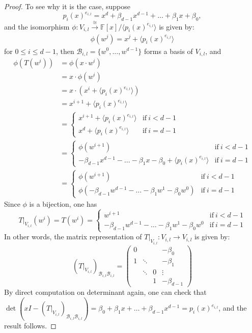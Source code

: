 \documentclass[12pt]{amsbook}
\begin{document}
\begin{proof}
\bigskip
To see why it is the case, suppose 
$$p_i(x)^{e_{i,l}} = x^d + \beta_{d-1}x^{d-1} + \dots + \beta_1 x + \beta_0,$$ 
and the isomorphism $\phi : V_{i,l} \xrightarrow{\cong} \mathbb{F}[x]/\langle p_i(x)^{e_{i,l}} \rangle$ is given by:
\begin{align*}
\phi(w^{j}) = x^j + \langle p_i(x)^{e_{i,l}} \rangle 
\end{align*}
for $0 \leq i \leq d-1$, then $\mathcal{B}_{i,l} = \{w^0, \dots, w^{d-1}\}$ forms a basis of $V_{i,l}$, and 
\begin{align*}
\phi(T(w^i)) &= \phi(x \cdot w^i)\\ 
&= x \cdot \phi(w^i)\\ &= x \cdot \left(x^{i} + \langle p_i(x)^{e_{i,l}} \rangle\right)\\ 
&= x^{i+1} + \langle p_i(x)^{e_{i,l}} \rangle \\
&= \begin{cases} x^{i+1} + \langle p_i(x)^{e_{i,l}} \rangle & \text{if}\ i < d-1 \\
x^d +  \langle p_i(x)^{e_{i,l}} \rangle & \text{if}\ i = d-1 \end{cases}\\
&= \begin{cases} \phi(w^{i+1}) & \text{if}\ i < d-1 \\
-\beta_{d-1}x^{d-1} - \dots - \beta_1 x - \beta_0 +  \langle p_i(x)^{e_{i,l}} \rangle & \text{if}\ i = d-1 \end{cases} \\
&= \begin{cases} \phi(w^{i+1}) & \text{if}\ i < d-1 \\
\phi(-\beta_{d-1}w^{d-1} - \dots - \beta_1 w^{1} - \beta_0 w^0) & \text{if}\ i = d-1 \end{cases} 
\end{align*}
Since $\phi$ is a bijection, one has
$$T|_{V_{i,l}}(w^i) = T(w^i)= \begin{cases} w^{i+1} & \text{if}\ i < d-1 \\
-\beta_{d-1}w^{d-1} - \dots - \beta_1 w^{1} - \beta_0 w^0 & \text{if}\ i = d-1 \end{cases} $$
In other words, the matrix representation of $T|_{V_{i,l}}: V_{i,l} \to V_{i,l}$ is given by:
$$(T|_{V_{i,l}})_{\mathcal{B}_{i,l}\mathcal{B}_{i,l}} = \begin{pmatrix}
    0 &  &  &  -\beta_0 \\
    1 & \ddots     & &   -\beta_1 \\
    & \ddots & 0 &  \vdots \\ 
     &  & 1 & -\beta_{d-1}
\end{pmatrix}$$
By direct computation on determinant again, one can check that $\det(xI - (T|_{V_{i,l}})_{\mathcal{B}_{i,l}\mathcal{B}_{i,l}}) = \beta_0 + \beta_1 x + \dots + \beta_{d-1}x^{d-1} = p_i(x)^{e_{i,l}}$, and the result follows.
\end{proof}
\end{document}
